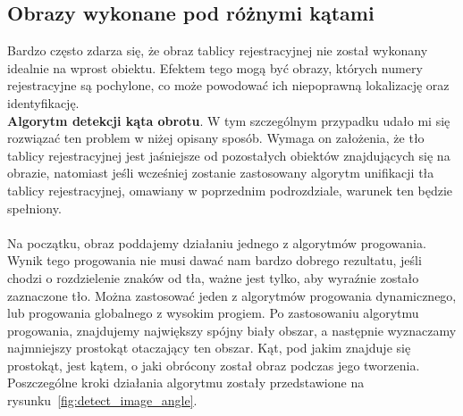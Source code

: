 \subsection{Obrazy wykonane pod różnymi kątami}
Bardzo często zdarza się, że obraz tablicy rejestracyjnej nie został wykonany idealnie na wprost obiektu. Efektem tego mogą być obrazy, których numery rejestracyjne są pochylone, co może powodować ich niepoprawną lokalizację oraz identyfikację. \\
\textbf{Algorytm detekcji kąta obrotu}. W tym szczególnym przypadku udało mi się rozwiązać ten problem w niżej opisany sposób. Wymaga on założenia, że tło tablicy rejestracyjnej jest jaśniejsze od pozostałych obiektów znajdujących się na obrazie, natomiast jeśli wcześniej zostanie zastosowany algorytm unifikacji tła tablicy rejestracyjnej, omawiany w poprzednim podrozdziale, warunek ten będzie spełniony.
\paragraph{}
Na początku, obraz poddajemy działaniu jednego z algorytmów progowania. Wynik tego progowania nie musi dawać nam bardzo dobrego rezultatu, jeśli chodzi o rozdzielenie znaków od tła, ważne jest tylko, aby wyraźnie zostało zaznaczone tło. Można zastosować jeden z algorytmów progowania dynamicznego, lub progowania globalnego z wysokim progiem. Po zastosowaniu algorytmu progowania, znajdujemy największy spójny biały obszar, a następnie wyznaczamy najmniejszy prostokąt otaczający ten obszar. Kąt, pod jakim znajduje się prostokąt, jest kątem, o jaki obrócony został obraz podczas jego tworzenia.\\
Poszczególne kroki działania algorytmu zostały przedstawione na rysunku~\ref{fig:detect_image_angle}.

